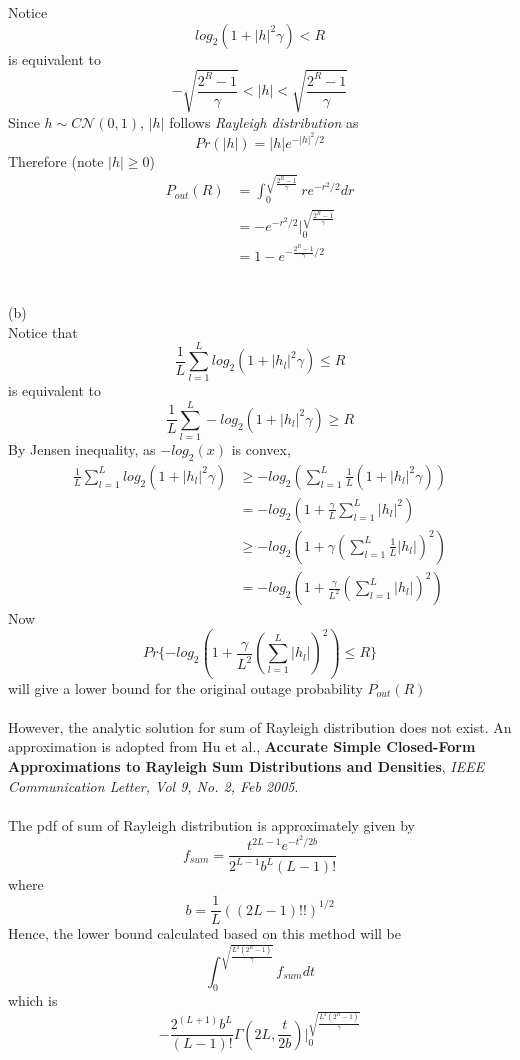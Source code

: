 \documentclass [12pt] {article}
\begin{document}
Notice $$log_2(1+|h|^2 \gamma) < R$$
is equivalent to $$ -\sqrt{\frac{2^R-1}{\gamma}}<|h|<\sqrt{\frac{2^R-1}{\gamma}}$$
Since $h \sim C\mathcal{N}(0,1)$, $|h|$ follows \emph{Rayleigh distribution} as 
$$ Pr(|h|) = |h| e^{-|h|^2/2}$$
Therefore (note $ |h| \geq 0$) \begin{align*}
 P_{out} (R) &= \int_0^{\sqrt{\frac{2^R-1}{\gamma}}} r e^{-r^2/2} dr\\
  &= -e^{-r^2/2}\Big|_0^{\sqrt{\frac{2^R-1}{\gamma}}}\\
  &= 1-e^{-\frac{2^R-1}{\gamma}/2}
\end{align*}
~\\
\pagebreak
~\\
(b)\\
Notice that $$\frac{1}{L}\sum\limits_{l=1}^L log_2(1+|h_l|^2\gamma)\leq R$$
is equivalent to  $$\frac{1}{L}\sum\limits_{l=1}^L -log_2(1+|h_l|^2\gamma)\geq R$$
By Jensen inequality, as $-log_2(x)$ is convex, 
\begin{align*}
\frac{1}{L}\sum\limits_{l=1}^L log_2(1+|h_l|^2\gamma) &\geq -log_2 (\sum\limits_{l=1}^L \frac{1}{L}(1+|h_l|^2\gamma))\\
&= -log_2(1+\frac{\gamma}{L} \sum\limits_{l=1}^L |h_l|^2)\\
&\geq -log_2(1+\gamma (\sum\limits_{l=1}^L \frac{1}{L}|h_l|)^2)\\
&= -log_2(1+\frac{\gamma}{L^2} (\sum\limits_{l=1}^L|h_l|)^2)
\end{align*}
Now $$Pr\{ -log_2(1+\frac{\gamma}{L^2} (\sum\limits_{l=1}^L|h_l|)^2) \leq R\} $$
will give a lower bound for the original outage probability $P_{out}(R)$\\
~\\
However, the analytic solution for sum of Rayleigh distribution does not exist. An approximation is adopted from Hu et al., \textbf{Accurate Simple Closed-Form Approximations to Rayleigh Sum Distributions and Densities}, \emph{IEEE Communication Letter, Vol 9, No. 2, Feb 2005}. \\
~\\
The pdf of sum of Rayleigh distribution is approximately given by $$ f_{sum} = \frac{t^{2L-1}e^{-t^2/2b}}{2^{L-1}b^{L}(L-1)!}$$
where $$b = \frac{1}{L}((2L-1)!!)^{1/2}$$
Hence, the lower bound calculated based on this method will be $$\int_0^{\sqrt{\frac{L^2 (2^R-1)}{\gamma}}}f_{sum} dt  $$
which is $$ - \frac{2^(L+1) b^L}{(L-1)!} \Gamma(2L, \frac{t}{2b}) \Big|_0^{\sqrt{\frac{L^2 (2^R-1)}{\gamma}}}$$
~\\
~\\
\end{document}
